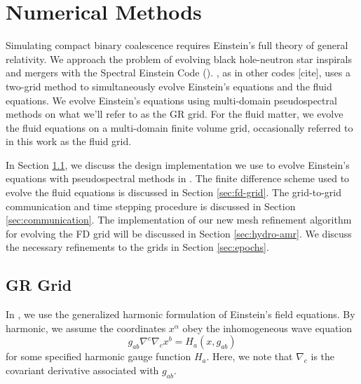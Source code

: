 \chapter{Numerical Methods}
\label{chap:chapter-3}
	
Simulating compact binary coalescence requires Einstein's full theory of general relativity.
We approach the problem of evolving black hole-neutron star inspirals and mergers with the Spectral Einstein Code (\SpEC).  
\SpEC, as in other codes [cite], uses a two-grid method to simultaneously evolve Einstein's equations and the fluid equations.
We evolve Einstein's equations using multi-domain pseudospectral methods on what we'll refer to as the GR grid.
For the fluid matter, we evolve the fluid equations on a multi-domain finite volume grid, occasionally referred to in this work as the fluid grid.

In Section \ref{sec:gr-grid}, we discuss the design implementation we use to evolve Einstein's equations with pseudospectral methods in \SpEC.  The finite difference scheme used to evolve the fluid equations is discussed in Section \ref{sec:fd-grid}.  The grid-to-grid communication and time stepping procedure is discussed in Section \ref{sec:communication}.  The implementation of our new mesh refinement algorithm for evolving the FD grid will be discussed in Section \ref{sec:hydro-amr}.  We discuss the necessary refinements to the grids in Section \ref{sec:epochs}.

\section{GR Grid}
\label{sec:gr-grid}

In \SpEC, we use the generalized harmonic formulation of Einstein's field equations.  By harmonic, we assume the coordinates $x^\alpha$ obey the inhomogeneous  wave equation
\begin{equation}
g_{ab} \nabla^c \nabla_c x^b = H_a (x, g_{ab})
\end{equation}
for some specified harmonic gauge function $H_a$.  Here, we note that $\nabla_c$ is the covariant derivative associated with $g_{ab}$.  

